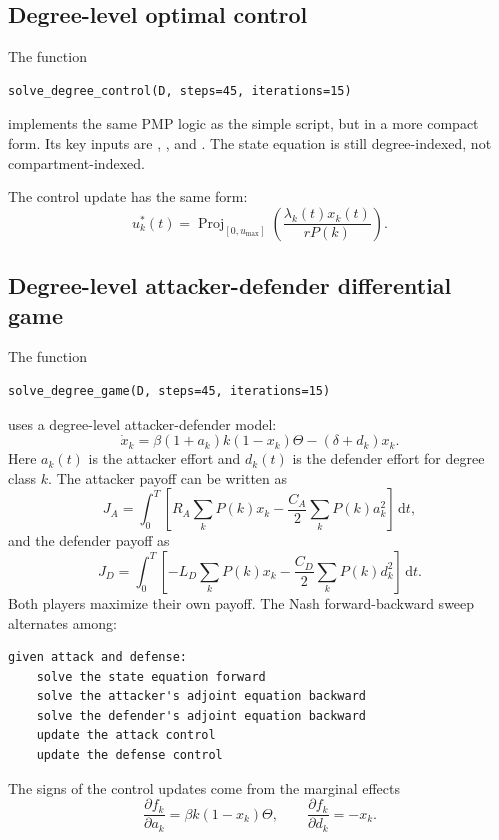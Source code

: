 \documentclass[11pt,a4paper]{article}
\DeclareRobustCommand{\code}[1]{\texttt{\detokenize{#1}}}
\newcommand{\dd}{\,\mathrm{d}}
\newcommand{\Proj}{\operatorname{Proj}}
\begin{document}
\subsection{Degree-level optimal control}

The function

\begin{lstlisting}[style=py]
solve_degree_control(D, steps=45, iterations=15)
\end{lstlisting}

implements the same PMP logic as the simple script, but in a more compact form. Its key inputs are \code{D.k}, \code{D.pk}, and \code{D.kbar}. The state equation is still degree-indexed, not compartment-indexed.

The control update has the same form:
\[
  u_k^*(t)=\Proj_{[0,u_{\max}]}
  \left(\frac{\lambda_k(t)x_k(t)}{rP(k)}\right).
\]

\subsection{Degree-level attacker-defender differential game}

The function

\begin{lstlisting}[style=py]
solve_degree_game(D, steps=45, iterations=15)
\end{lstlisting}

uses a degree-level attacker-defender model:
\[
  \dot{x}_k
  =\beta(1+a_k)k(1-x_k)\Theta
  -(\delta+d_k)x_k.
\]
Here \(a_k(t)\) is the attacker effort and \(d_k(t)\) is the defender effort for degree class \(k\). The attacker payoff can be written as
\[
  J_A=\int_0^T
  \left[
    R_A\sum_kP(k)x_k
    -\frac{C_A}{2}\sum_kP(k)a_k^2
  \right]\dd t,
\]
and the defender payoff as
\[
  J_D=\int_0^T
  \left[
    -L_D\sum_kP(k)x_k
    -\frac{C_D}{2}\sum_kP(k)d_k^2
  \right]\dd t.
\]
Both players maximize their own payoff. The Nash forward-backward sweep alternates among:

\begin{lstlisting}[style=text]
given attack and defense:
    solve the state equation forward
    solve the attacker's adjoint equation backward
    solve the defender's adjoint equation backward
    update the attack control
    update the defense control
\end{lstlisting}

The signs of the control updates come from the marginal effects
\[
  \frac{\partial f_k}{\partial a_k}=\beta k(1-x_k)\Theta,
  \qquad
  \frac{\partial f_k}{\partial d_k}=-x_k.
\]
\end{document}
